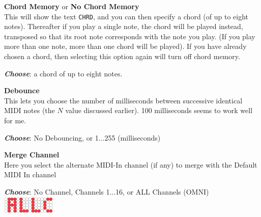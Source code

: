 \documentclass{article}
\begin{document}
\begin{description}
	\item{\bf Chord Memory} or {\bf No Chord Memory}\\
		This will show the text \texttt{CHRD}, and you can then specify a chord (of up to eight notes).  Thereafter if you play a single note, the chord will be played instead, transposed so that its root note corresponds with the note you play. (If you play more than one note, more than one chord will be played).  If you have already chosen a chord, then selecting this option again will turn off chord memory.
				
		\begin{description}
		\item{\bf \textit{Choose}}: a chord of up to eight notes.
		\end{description}
		
	\item{\bf Debounce}\\
		This lets you choose the number of milliseconds between successive identical MIDI notes (the \(N\) value discussed earlier).  100 milliseconds seems to work well for me.
		\begin{description}
		\item{\bf \textit{Choose}}: No Debouncing, or 1...255 (milliseconds)\\\rule[0em]{0em}{0em}\hspace{\fill} 
		\end{description}

	\item{\bf Merge Channel}\\
		Here you select the alternate MIDI-In channel (if any) to merge with the Default MIDI In channel
		\begin{description}
		\item{\bf \textit{Choose}}: No Channel, Channels 1...16, or ALL Channels (OMNI)~{\includegraphics[width=1in]{all.pdf}}
		\end{description}

				
	\end{description}
\end{document}

